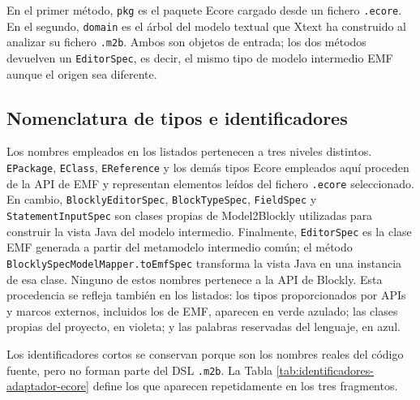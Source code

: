 En el primer método, \texttt{pkg} es el paquete Ecore cargado desde
un fichero \texttt{.ecore}. En el segundo, \texttt{domain} es el árbol del modelo
textual que Xtext ha construido al analizar su fichero \texttt{.m2b}. Ambos son
objetos de entrada; los dos métodos devuelven un \texttt{EditorSpec}, es decir,
el mismo tipo de modelo intermedio EMF aunque el origen sea diferente.

\subsection{Nomenclatura de tipos e identificadores}

Los nombres empleados en los listados pertenecen a tres niveles distintos.
\texttt{EPackage}, \texttt{EClass}, \texttt{EReference} y los demás tipos Ecore
empleados aquí proceden de la API de EMF y representan elementos leídos del
fichero \texttt{.ecore} seleccionado. En cambio,
\texttt{BlocklyEditorSpec}, \texttt{BlockTypeSpec}, \texttt{FieldSpec} y
\texttt{StatementInputSpec} son clases propias de Model2Blockly utilizadas para
construir la vista Java del modelo intermedio. Finalmente, \texttt{EditorSpec}
es la clase EMF generada a partir del metamodelo intermedio común; el método
\texttt{BlocklySpecModelMapper.toEmfSpec} transforma la vista Java en una
instancia de esa clase. Ninguno de estos nombres pertenece a la API de Blockly.
Esta procedencia se refleja también en los listados: los tipos proporcionados
por APIs y marcos externos, incluidos los de EMF, aparecen en verde azulado;
las clases propias del proyecto, en violeta; y las palabras reservadas del
lenguaje, en azul.

Los identificadores cortos se conservan porque son los nombres reales del
código fuente, pero no forman parte del DSL \texttt{.m2b}. La Tabla
\ref{tab:identificadores-adaptador-ecore} define los que aparecen repetidamente
en los tres fragmentos.

